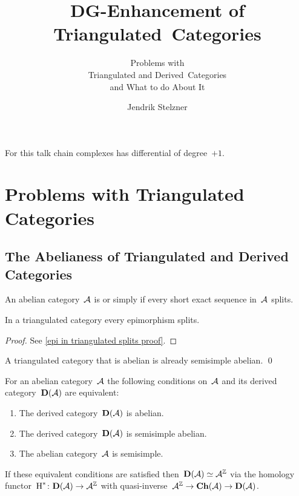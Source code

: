 \documentclass[a4paper,10pt]{scrartcl}
\title{DG-Enhancement of Triangulated~Categories}
\subtitle{Problems with \\ Triangulated and Derived~Categories \\ and What to do About It}
\author{Jendrik Stelzner}
\date{}
\begin{document}
\maketitle
  
\vspace{-1em}





For this talk chain complexes has differential of degree~$+1$.





\section{Problems with Triangulated Categories}



\subsection{The Abelianess of Triangulated and Derived Categories}

\begin{definition}
  An abelian category~$\mathcal{A}$ is  or simply  if every short exact sequence in~$\mathcal{A}$ splits.
\end{definition}

\begin{lemma}
  \label{epi in triangulated splits}
  In a triangulated category every epimorphism splits.
\end{lemma}

\begin{proof}
  See \cref{epi in triangulated splits proof}.
\end{proof}

\begin{corollary}
  \label{triangulated abelian is semisimple}
  A triangulated category that is abelian is already semisimple abelian.
  \qed
\end{corollary}

\begin{proposition}
  \label{when the derived is abelian}
  For an abelian category~$\mathcal{A}$ the following conditions on~$\mathcal{A}$ and its derived category~$\mathbf{D}(\mathcal{A})$ are equivalent:
  \begin{enumerate}
    \item
      \label{derived is abelian}
      The derived category~$\mathbf{D}(\mathcal{A})$ is abelian.
    \item
      \label{derived is semisimple abelian}
      The derived category~$\mathbf{D}(\mathcal{A})$ is semisimple abelian.
    \item
      \label{original is semisimple}
      The abelian category~$\mathcal{A}$ is semisimple.
  \end{enumerate}
  If these equivalent conditions are satisfied then~$\mathbf{D}(\mathcal{A}) \simeq \mathcal{A}^{\mathbb{Z}}$ via the homology functor~$\operatorname{H}^* \colon \mathbf{D}(\mathcal{A}) \to \mathcal{A}^{\mathbb{Z}}$ with quasi-inverse~$\mathcal{A}^{\mathbb{Z}} \to \mathbf{Ch}(\mathcal{A}) \to \mathbf{D}(\mathcal{A})$.
\end{proposition}
\end{document}
